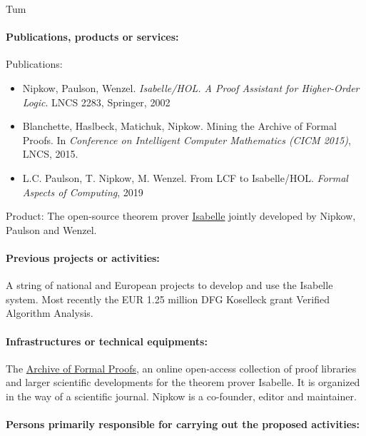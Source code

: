 \begin{sitedescription}{Tum}
\begin{compactitem}
\item{} 
\end{compactitem}

\paragraph{Publications, products or services:}

Publications:
\begin{itemize}
\item Nipkow, Paulson, Wenzel. \emph{Isabelle/HOL. A Proof
    Assistant for Higher-Order Logic}. LNCS 2283, Springer, 2002
\item Blanchette, Haslbeck, Matichuk, Nipkow. Mining the Archive of Formal Proofs. In \emph{Conference on Intelligent Computer Mathematics (CICM 2015)}, LNCS, 2015.
\item L.C. Paulson, T. Nipkow, M. Wenzel. From LCF to
  Isabelle/HOL. \emph{Formal Aspects of Computing}, 2019
\end{itemize}

Product: The open-source theorem prover  \href{http://isabelle.in.tum.de}{Isabelle}
jointly developed by Nipkow, Paulson and Wenzel.

\paragraph{Previous projects or activities:}

A string of national and European projects to develop and use the Isabelle
system. Most recently the EUR 1.25 million DFG Koselleck grant Verified Algorithm Analysis.

\paragraph{Infrastructures or technical equipments:}

The \href{http://www.isa-afp.org}{Archive of Formal Proofs}, an online
open-access collection of proof libraries and larger scientific
developments for the theorem prover Isabelle. It is organized in the
way of a scientific journal.  Nipkow is a co-founder, editor and maintainer.

\paragraph{Persons primarily responsible for carrying out the proposed activities:}


\end{sitedescription}
